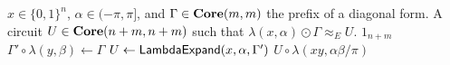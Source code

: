 \begin{algorithm}[t]
\caption{$\LambdaExpand( x, \alpha, \Gamma )$}\label{Alg:LambdaExpand}
\begin{algorithmic}
\Require $x \in \{ 0, 1 \}^n$, $\alpha \in (-\pi, \pi]$, and $\Gamma \in \mathbf{Core}( m, m )$ the prefix of a diagonal form.
\Ensure A circuit $U \in \mathbf{Core}( n + m, n + m )$ such that $\lambda( x, \alpha ) \odot \Gamma \approx_E U$.
        \Return $1_{n+m}$
    \EndIf
    \State $\Gamma' \circ \lambda( y, \beta ) \gets \Gamma$
    \State $U \gets \mathsf{LambdaExpand}( x, \alpha, \Gamma' )$
    \State \Return $U \circ \lambda( xy, \alpha\beta / \pi )$
\end{algorithmic}
\end{algorithm}
